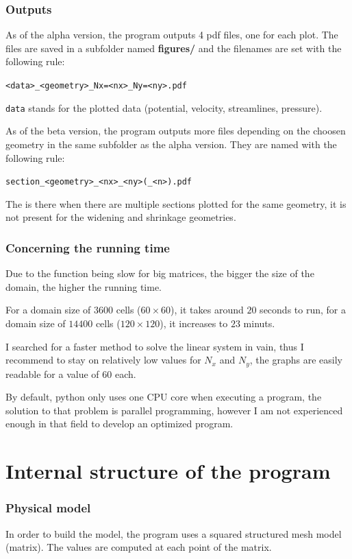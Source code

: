 \section{Outputs}
As of the alpha version, the program outputs 4 pdf files, one for each plot.
The files are saved in a subfolder named \textbf{figures/} and the filenames
are set with the following rule:

\begin{center}
      \texttt{<data>_<geometry>_Nx=<nx>_Ny=<ny>.pdf}
\end{center}
\texttt{data} stands for the plotted data (potential, velocity,
streamlines, pressure).

As of the beta version, the program outputs more files depending on the choosen
geometry in the same subfolder as the alpha version. They are named with the
following rule:
\begin{center}
      \texttt{section_<geometry>_<nx>_<ny>(_<n>).pdf}
\end{center}
The  is there when there are multiple sections plotted for the same
geometry, it is not present for the widening and shrinkage geometries.
\section{Concerning the running time}
Due to the function  being slow for
big matrices, the bigger the size of the domain, the higher the running time.

For a domain size of $\num{3600}$ cells ($\num{60} \times \num{60}$), it takes
around $\num{20}$ seconds to run, for a domain size of $\num{14400}$ cells
($\num{120} \times \num{120}$), it increases to $\num{23}$ minuts. 

I searched for a faster method to solve the linear system in vain, thus I
recommend to stay on relatively low values for $N_x$ and $N_y$, the graphs are
easily readable for a value of $\num{60}$ each.

By default, python only uses one CPU core when executing a program, the
solution to that problem is parallel programming, however I am not experienced
enough in that field to develop an optimized program.

\newpage
\part{Internal structure of the program}
\section{Physical model}
In order to build the model, the program uses a squared structured mesh
model (matrix). The values are computed at each point of the matrix.

